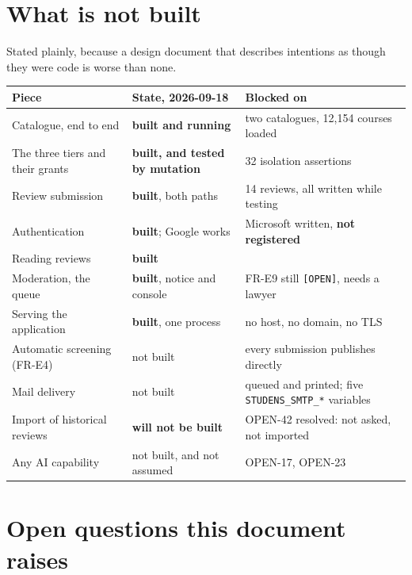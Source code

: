 \documentclass[11pt,a4paper]{article}
\begin{document}
\newpage
\section{What is not built}

Stated plainly, because a design document that describes intentions as though
they were code is worse than none.

\begin{center}
\sffamily\small
\begin{tabular}{@{}p{4.6cm}p{4.0cm}p{5.4cm}@{}}
\toprule
\textbf{Piece} & \textbf{State, 2026-09-18} & \textbf{Blocked on} \\
\midrule
Catalogue, end to end & \textbf{built and running} & two catalogues, 12{,}154 courses loaded \\
The three tiers and their grants & \textbf{built, and tested by mutation} & 32 isolation assertions \\
Review submission & \textbf{built}, both paths & 14 reviews, all written while testing \\
Authentication & \textbf{built}; Google works & Microsoft written, \textbf{not registered} \\
Reading reviews & \textbf{built} & \\
Moderation, the queue & \textbf{built}, notice and console & FR-E9 still \texttt{[OPEN]}, needs a lawyer \\
Serving the application & \textbf{built}, one process & no host, no domain, no TLS \\
Automatic screening (FR-E4) & not built & every submission publishes directly \\
Mail delivery & not built & queued and printed; five \texttt{STUDENS\_SMTP\_*} variables \\
Import of historical reviews & \textbf{will not be built} & OPEN-42 resolved: not asked, not imported \\
Any AI capability & not built, and not assumed & OPEN-17, OPEN-23 \\
\bottomrule
\end{tabular}
\end{center}

\section{Open questions this document raises}
\end{document}
